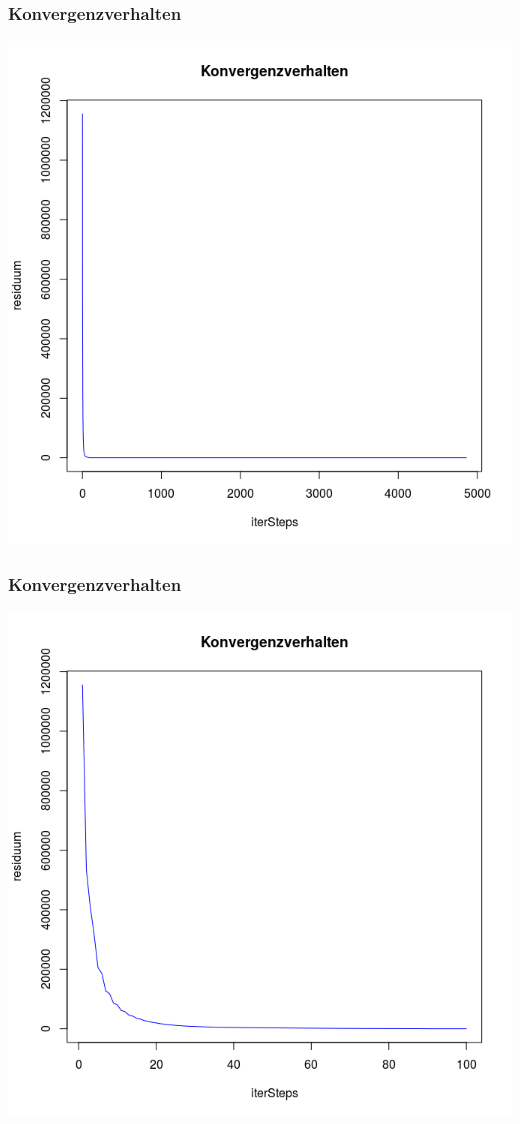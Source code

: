 \documentclass[]{beamer}
\begin{document}
\begin{frame}
\frametitle{Konvergenzverhalten} 
\begin{center}
\includegraphics[scale=0.3]{Konvergenzverhalten_ganz.png}
\end{center}
\end{frame}

\begin{frame}
\frametitle{Konvergenzverhalten} 
\begin{center}
\includegraphics[scale=0.33]{Konvergenzverhalten_1_100.png}
\end{center}
\end{frame}
\end{document}

